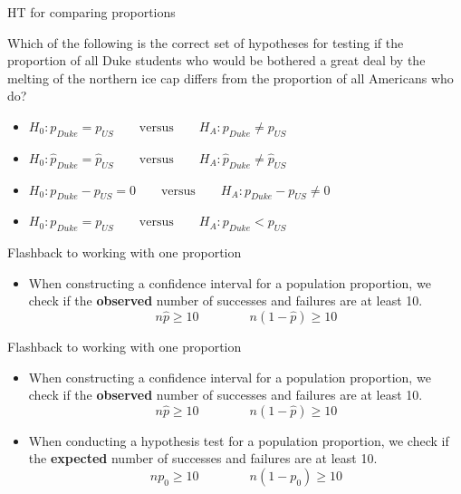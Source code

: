 \documentclass[
  ignorenonframetext,
]{beamer}
\providecommand{\tightlist}{%
  \setlength{\itemsep}{0pt}\setlength{\parskip}{0pt}}
\begin{document}
\begin{frame}{HT for comparing proportions}
\protect\hypertarget{ht-for-comparing-proportions-1}{}

Which of the following is the correct set of hypotheses for testing if
the proportion of all Duke students who would be bothered a great deal
by the melting of the northern ice cap differs from the proportion of
all Americans who do?

\begin{itemize}
\tightlist
\item
  \protect\hypertarget{highlight}{}{\(H_0: p_{Duke} = p_{US} \qquad \text{versus} \qquad H_A: p_{Duke} \ne p_{US}\)
  }
\item
  \(H_0: \hat{p}_{Duke} = \hat{p}_{US} \qquad \text{versus} \qquad H_A: \hat{p}_{Duke} \ne \hat{p}_{US}\)
\item
  \protect\hypertarget{highlight}{}{\(H_0: p_{Duke} - p_{US} = 0 \qquad \text{versus} \qquad H_A: p_{Duke} - p_{US} \ne 0\)
  }
\item
  \(H_0: p_{Duke} = p_{US} \qquad \text{versus} \qquad H_A: p_{Duke} < p_{US}\)
\end{itemize}

\end{frame}

\begin{frame}{Flashback to working with one proportion}
\protect\hypertarget{flashback-to-working-with-one-proportion}{}

\begin{itemize}
\tightlist
\item
  When constructing a confidence interval for a population proportion,
  we check if the \textbf{observed} number of successes and failures are
  at least 10. \[
  n\hat{p} \ge 10 \qquad \qquad n(1-\hat{p}) \ge 10
  \]
\end{itemize}

\end{frame}

\begin{frame}{Flashback to working with one proportion}
\protect\hypertarget{flashback-to-working-with-one-proportion-1}{}

\begin{itemize}
\tightlist
\item
  When constructing a confidence interval for a population proportion,
  we check if the \textbf{observed} number of successes and failures are
  at least 10. \[
  n\hat{p} \ge 10 \qquad \qquad n(1-\hat{p}) \ge 10
  \]
\item
  When conducting a hypothesis test for a population proportion, we
  check if the \textbf{expected} number of successes and failures are at
  least 10. \[
  np_0 \ge 10 \qquad \qquad n(1-p_0) \ge 10
  \]
\end{itemize}

\end{frame}
\end{document}
